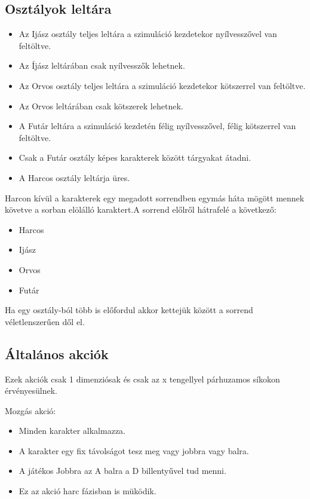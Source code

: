 \subsection{Osztályok leltára}
\begin{itemize}
  \item Az Ijász osztály teljes leltára a szimuláció kezdetekor  nyílvesszővel van feltöltve.
  \item Az Íjász leltárában csak nyílvesszők lehetnek.
  \item Az Orvos osztály teljes leltára a szimuláció kezdetekor kötszerrel van feltöltve.
  \item Az Orvos leltárában csak kötszerek lehetnek.
  \item A Futár leltára a szimuláció kezdetén félig nyílvesszővel, félig kötszerrel van feltöltve.
  \item Csak a Futár osztály képes karakterek között tárgyakat átadni.
  \item A Harcos osztály leltárja üres.
  
\end{itemize}


Harcon kívül a karakterek egy megadott sorrendben egymás háta mögött mennek követve a sorban elölálló karaktert.A sorrend előlről hátrafelé a következő:
\begin{itemize}
\item Harcos
\item Ijász
\item Orvos
\item Futár
\end{itemize}
Ha egy osztály-ból több is előfordul akkor kettejük között a sorrend véletlenszerűen dől el.

\subsection{Általános akciók}

Ezek akciók csak 1 dimenziósak és csak az x tengellyel párhuzamos síkokon érvényesülnek.

Mozgás akció:

\begin{itemize}
  \item Minden karakter alkalmazza.
  \item A karakter egy fix távolságot tesz meg vagy jobbra vagy balra.
  \item A játékos Jobbra az A  balra a D billentyűvel tud menni.
  \item Ez az akció harc fázisban is müködik.
\end{itemize}

